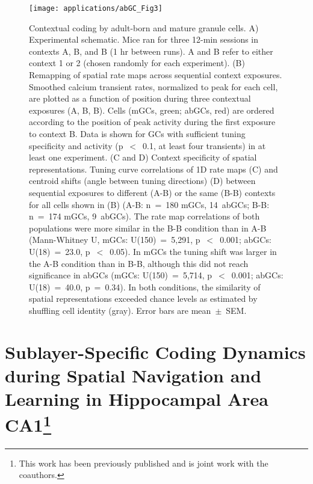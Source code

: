 \begin{figure}
	\centering
	\texttt{[image: applications/abGC\_Fig3]}
	\caption[Contextual coding by adult-born and mature granule cells]{Contextual coding by adult-born and mature granule cells.
	A) Experimental schematic. Mice ran for three 12-min sessions in contexts A, B, and B (1 hr between runs). A and B refer to either context 1 or 2 (chosen randomly for each experiment).
	(B) Remapping of spatial rate maps across sequential context exposures. Smoothed calcium transient rates, normalized to peak for each cell, are plotted as a function of position during three contextual exposures (A, B, B). Cells (mGCs, green; abGCs, red) are ordered according to the position of peak activity during the first exposure to context B. Data is shown for GCs with sufficient tuning specificity and activity (p~$<$~0.1, at least four transients) in at least one experiment.
	(C and D) Context specificity of spatial representations. Tuning curve correlations of 1D rate maps (C) and centroid shifts (angle between tuning directions) (D) between sequential exposures to different (A-B) or the same (B-B) contexts for all cells shown in (B) (A-B: n~=~180 mGCs, 14~abGCs; B-B: n~=~174 mGCs, 9~abGCs). The rate map correlations of both populations were more similar in the B-B condition than in A-B (Mann-Whitney U, mGCs: U(150)~=~5,291, p~$<$~0.001; abGCs: U(18)~=~23.0, p~$<$~0.05). In mGCs the tuning shift was larger in the A-B condition than in B-B, although this did not reach significance in abGCs (mGCs: U(150)~=~5,714, p~$<$~0.001; abGCs: U(18)~=~40.0, p~=~0.34). In both conditions, the similarity of spatial representations exceeded chance levels as estimated by shuffling cell identity (gray).
	Error bars are mean~$\pm$~SEM.}
	\label{fig:other:dg:context}
\end{figure}

\section[Sublayer-Specific Coding Dynamics during Spatial Navigation and Learning in Hippocampal Area CA1]{Sublayer-Specific Coding Dynamics during Spatial Navigation and Learning in Hippocampal Area CA1\footnote{This work has been previously published \citep{Danielson2016b} and is joint work with the coauthors.}}
\label{sec:other:sf-deep}

